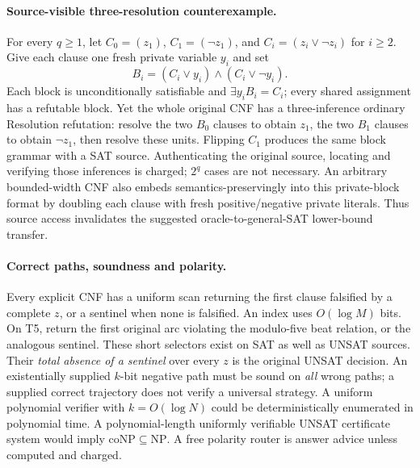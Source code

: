 \documentclass[11pt]{article}
\begin{document}
\paragraph{Source-visible three-resolution counterexample.}
For every $q\ge1$, let $C_0=(z_1)$,
$C_1=(\neg z_1)$, and $C_i=(z_i\vee\neg z_i)$
for $i\ge2$.  Give each clause one fresh private variable
$y_i$ and set
\[
 B_i=(C_i\vee y_i)\wedge(C_i\vee\neg y_i).
\]
Each block is unconditionally satisfiable and
$\exists y_iB_i=C_i$; every shared assignment has
a refutable block.  Yet the whole original CNF has a
three-inference ordinary Resolution refutation:
resolve the two $B_0$ clauses to obtain $z_1$,
the two $B_1$ clauses to obtain $\neg z_1$,
then resolve these units.  Flipping $C_1$ produces
the same block grammar with a SAT source.
Authenticating the original source, locating and verifying
those inferences is charged; $2^q$ cases are not
necessary.  An arbitrary bounded-width CNF also embeds
semantics-preservingly into this private-block format
by doubling each clause with fresh positive/negative
private literals.  Thus source access invalidates the
suggested oracle-to-general-SAT lower-bound transfer.

\paragraph{Correct paths, soundness and polarity.}
Every explicit CNF has a uniform scan returning the
first clause falsified by a complete $z$, or a sentinel
when none is falsified.  An index uses $O(\log M)$ bits.
On T5, return the first original arc violating the
modulo-five beat relation, or the analogous sentinel.
These short selectors exist on SAT as well as UNSAT
sources.  Their \emph{total absence of a sentinel}
over every $z$ is the original UNSAT decision.
An existentially supplied $k$-bit negative path must
be sound on \emph{all} wrong paths; a supplied correct
trajectory does not verify a universal strategy.
A uniform polynomial verifier with $k=O(\log N)$
could be deterministically enumerated in polynomial time.
A polynomial-length uniformly verifiable UNSAT
certificate system would imply
$\mathrm{coNP}\subseteq\mathrm{NP}$.
A free polarity router is answer advice unless
computed and charged.
\end{document}
